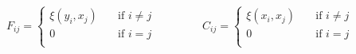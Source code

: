 \documentclass[titlepage,11pt]{article}
\begin{document}
\begin{linenumbers}
\begin{singlespace}
					\begin{linenomath*}	
						\begin{equation}\label{eq:fac _comp}	
							F_{ij} = 
							\begin{cases}
							\xi(y_i, x_j)&\quad\text{if } i \neq j \\
							0&\quad\text{if } i = j \\
							\end{cases}
							\hspace{50pt}
							C_{ij} = 
							\begin{cases}
							\xi(x_i, x_j)&\quad\text{if } i \neq j \\
							0&\quad\text{if } i = j \\
							\end{cases}
						\end{equation}
						

\end{linenomath*}
\end{singlespace}
\end{linenumbers}
\end{document}
